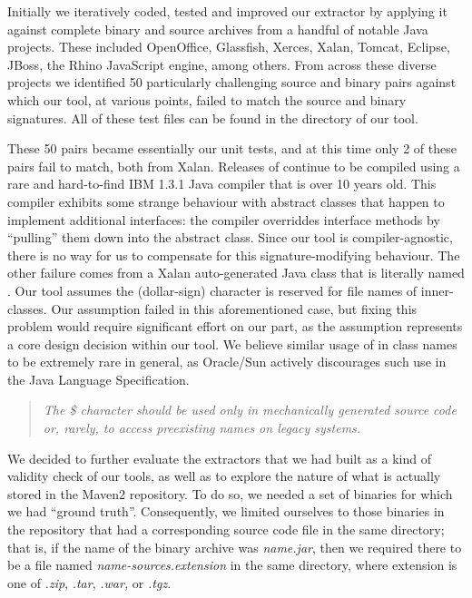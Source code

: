 Initially we iteratively coded, tested and improved our extractor by
applying it against complete binary and source archives from a handful of
notable Java projects.  These included OpenOffice, Glassfish, Xerces, Xalan, Tomcat,
Eclipse, JBoss, the Rhino JavaScript engine, among others.
From across these diverse projects we identified 50 particularly
challenging source and binary pairs against which our tool, at various points,
failed to match the source and binary signatures.
All of these test files can be found in the  directory
of our tool.

These 50 pairs
became essentially our unit tests, and at this time only 2 of these
pairs fail to match, both from Xalan.
Releases of  continue to be compiled
using a rare and hard-to-find IBM 1.3.1 Java compiler that is over 10 years old.
This compiler exhibits some strange behaviour with abstract classes
that happen to implement additional interfaces:
the compiler overriddes interface methods by ``pulling'' them down into the abstract class.
Since our tool is compiler-agnostic, there is no way for us to compensate for this signature-modifying behaviour.
The other failure comes from a Xalan auto-generated Java class that is
literally
named .  Our tool assumes the \mytt{\$} (dollar-sign) character is reserved for file names
of inner-classes.  Our assumption failed in this aforementioned case, but fixing this
problem would require significant effort on our part, as the assumption represents a core design decision within our tool.
We believe similar usage of \mytt{\$} in class names to be extremely rare in general,
as Oracle/Sun actively discourages such use in the Java Language Specification.

\begin{quote}
\emph{The \$ character should be used only in mechanically
generated source code or, rarely, to access preexisting names on legacy systems. \cite{jls2}}
\end{quote}


We decided to further evaluate the extractors that we had built as a kind of
validity check of our tools, as well as to explore the nature of what is
actually stored in the Maven2 repository.  To do so, we needed a set of
binaries for which we had ``ground truth''.  Consequently, we limited
ourselves to those binaries in the repository that had a corresponding
source code file in the same directory; that is, if the name of the binary
archive was \emph{name.jar}, then we required there to be a file named
\emph{name-sources.extension} in the same directory, where extension is one
of \emph{.zip}, \emph{.tar}, \emph{.war,} or \emph{.tgz}.

